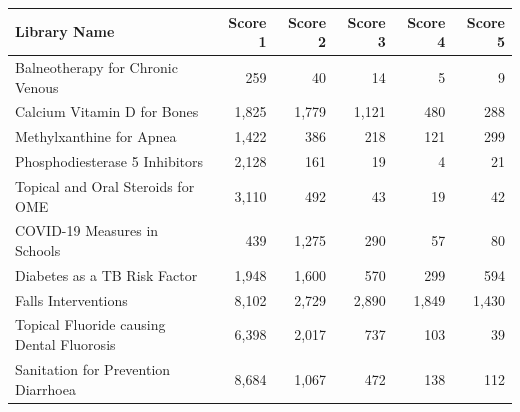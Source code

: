 \begin{tabularx}{\textwidth}{@{} X r r r r r @{}}
\toprule
\textbf{Library Name} & \textbf{Score 1} & \textbf{Score 2} & \textbf{Score 3} & \textbf{Score 4} & \textbf{Score 5} \\
\midrule
Balneotherapy for Chronic Venous & 259 & 40 & 14 & 5 & 9 \\
Calcium Vitamin D for Bones & 1,825 & 1,779 & 1,121 & 480 & 288 \\
Methylxanthine for Apnea & 1,422 & 386 & 218 & 121 & 299 \\
Phosphodiesterase 5 Inhibitors & 2,128 & 161 & 19 & 4 & 21 \\
Topical and Oral Steroids for OME & 3,110 & 492 & 43 & 19 & 42 \\
COVID-19 Measures in Schools & 439 & 1,275 & 290 & 57 & 80 \\
Diabetes as a TB Risk Factor & 1,948 & 1,600 & 570 & 299 & 594 \\
Falls Interventions & 8,102 & 2,729 & 2,890 & 1,849 & 1,430 \\
Topical Fluoride causing Dental Fluorosis & 6,398 & 2,017 & 737 & 103 & 39 \\
Sanitation for Prevention Diarrhoea & 8,684 & 1,067 & 472 & 138 & 112 \\
\bottomrule
\end{tabularx}